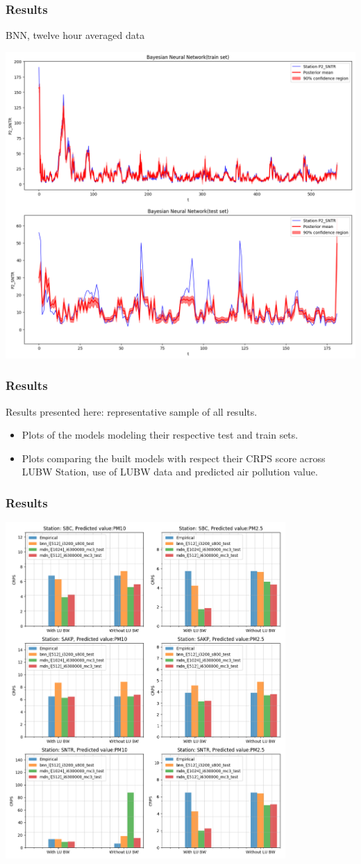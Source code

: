 \documentclass[18pt]{beamer}
\begin{document}
\begin{frame}[t]
  \frametitle{Results}
  BNN, twelve hour averaged data
  \begin{center}
    \includegraphics[scale=0.25]{images/12h/bnn_12h}
  \end{center}
\end{frame}

\begin{frame}[t]
  \frametitle{Results}
  Results presented here: representative sample of all results.
  \begin{itemize}
  \item Plots of the models modeling their respective test and train sets.
    \pause
  \item Plots comparing the built models with respect their CRPS score across LUBW Station, use of LUBW data and predicted air pollution value.
  \end{itemize}
\end{frame}

\begin{frame}[t]
  \frametitle{Results}
  \begin{center}
    \vspace*{-0.2in}
    \includegraphics[height=0.65\textwidth, width=0.8\textwidth ]{images/1h/results_plot_CRPS}
  \end{center}
\end{frame}
\end{document}

